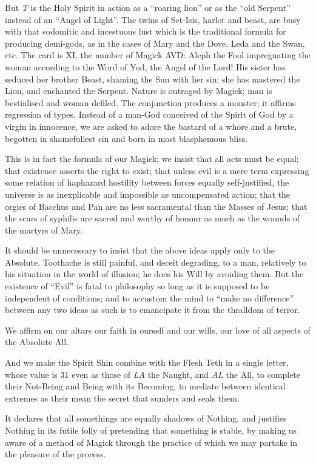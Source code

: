 But \textit{T} is the Holy Spirit in action as a \enquote{roaring lion} or as the \enquote{old Serpent} instead of an \enquote{Angel of Light}. The twins of Set-Isis, harlot and beast, are busy with that sodomitic and incestuous lust which is the traditional formula for producing demi-gods, as in the cases of Mary and the Dove, Leda and the Swan, etc. The card is XI, the number of Magick AVD: Aleph the Fool impregnating the woman according to the Word of Yod, the Angel of the Lord! His sister has seduced her brother Beast, shaming the Sun with her sin; she has mastered the Lion, and enchanted the Serpent. Nature is outraged by Magick; man is bestialised and woman defiled. The conjunction produces a monster; it affirms regression of types. Instead of a man-God conceived of the Spirit of God by a virgin in innocence, we are asked to adore the bastard of a whore and a brute, begotten in shamefullest sin and born in most blasphemous bliss.

This is in fact the formula of our Magick; we insist that all acts must be equal; that existence asserts the right to exist; that unless evil is a mere term expressing some relation of haphazard hostility between forces equally self-justified, the universe is as inexplicable and impossible as uncompensated action; that the orgies of Bacchus and Pan are no less sacramental than the Masses of Jesus; that the scars of syphilis are sacred and worthy of honour as much as the wounds of the martyrs of Mary.

It should be unnecessary to insist that the above ideas apply only to the Absolute. Toothache is still painful, and deceit degrading, to a man, relatively to his situation in the world of illusion; he does his Will by avoiding them. But the existence of \enquote{Evil} is fatal to philosophy so long as it is supposed to be independent of conditions; and to accustom the mind to \enquote{make no difference} between any two ideas as such is to emancipate it from the thralldom of terror.

We affirm on our altars our faith in ourself and our wills, our love of all aspects of the Absolute All.

And we make the Spirit Shin combine with the Flesh Teth in a single letter, whose value is 31 even as those of \textit{LA} the Naught, and \textit{AL} the All, to complete their Not-Being and Being with its Becoming, to mediate between identical extremes as their mean \textemdash{} the secret that sunders and seals them.

It declares that all somethings are equally shadows of Nothing, and justifies Nothing in its futile folly of pretending that something is stable, by making us aware of a method of Magick through the practice of which we may partake in the pleasure of the process.

